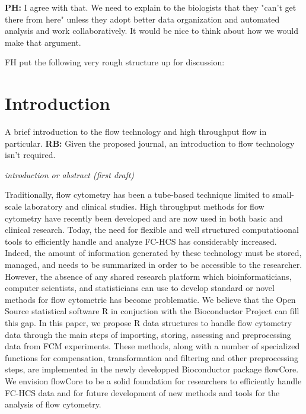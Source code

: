 \documentclass[12pt]{article}
\begin{document}
{\bf PH:} I agree with that. We need to explain to the biologists that they
"can't get there from here" unless they adopt better data organization
and automated analysis and work collaboratively. It would be nice to
think about how we would make that argument.

\bigskip
FH put the following very rough structure up for discussion:

\section{Introduction}

A brief introduction to the flow technology and high throughput flow
in particular.
{\bf RB:} Given the proposed journal, an introduction to flow technology isn't
required.

\textit{introduction or abstract (first draft)}

Traditionally, flow cytometry has been a tube-based technique limited
to small-scale laboratory and clinical studies.  High throughput
methods for flow cytometry have recently been developed and are now
used in both basic and clinical research. Today, the need for flexible
and well structured computatioonal tools to efficiently handle and
analyze FC-HCS has considerably increased. Indeed, the amount of
information generated by these technology must be stored, managed, and
needs to be summarized in order to be accessible to the
researcher. However, the absence of any shared research platform which
bioinformaticians, computer scientists, and statisticians can use to
develop standard or novel methods for flow cytometric has become
problematic. We believe that the Open Source statistical software R in
conjuction with the Bioconductor Project can fill this gap.  In this
paper, we propose R data structures to handle flow cytometry data
through the main steps of importing, storing, assessing and
preprocessing data from FCM experiments. These methods, along with a
number of specialized functions for compensation, transformation and
filtering and other preprocessing steps, are implemented in the newly
developped Bioconductor package flowCore.  We envision flowCore to be
a solid foundation for researchers to efficiently handle FC-HCS data
and for future development of new methods and tools for the analysis
of flow cytometry.
\end{document}
